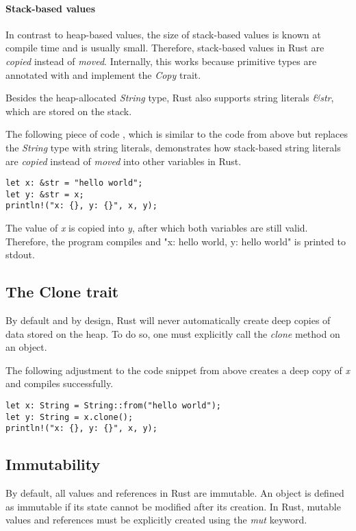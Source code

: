 \documentclass[sigplan,11pt,nonacm]{acmart}
\begin{document}
\paragraph{Stack-based values}

In contrast to heap-based values, the size of stack-based values is known at compile time and is usually small.
Therefore, stack-based values in Rust are \emph{copied} instead of \emph{moved}.
Internally, this works because primitive types are annotated with and implement the \emph{Copy} trait.

Besides the heap-allocated \emph{String} type, Rust also supports string literals \emph{\&str}, which are stored on the stack.

The following piece of code \cite{rust-book}, which is similar to the code from above but replaces the \emph{String} type with string literals, demonstrates how stack-based string literals are \emph{copied} instead of \emph{moved} into other variables in Rust.
\begin{lstlisting}
let x: &str = "hello world";
let y: &str = x;
println!("x: {}, y: {}", x, y);
\end{lstlisting}
The value of \emph{x} is copied into \emph{y}, after which both variables are still valid.
Therefore, the program compiles and "x: hello world, y: hello world" is printed to stdout.


\subsection{The Clone trait}
\label{sec:rust-clone-trait}

By default and by design, Rust will never automatically create deep copies of data stored on the heap.
To do so, one must explicitly call the \emph{clone} method on an object.

The following adjustment to the code snippet from above creates a deep copy of \emph{x} and compiles successfully.
\begin{lstlisting}
let x: String = String::from("hello world");
let y: String = x.clone();
println!("x: {}, y: {}", x, y);
\end{lstlisting}


\subsection{Immutability}
\label{sec:rust-immutability}

By default, all values and references in Rust are immutable.
An object is defined as immutable if its state cannot be modified after its creation.
In Rust, mutable values and references must be explicitly created using the \emph{mut} keyword.
\end{document}
